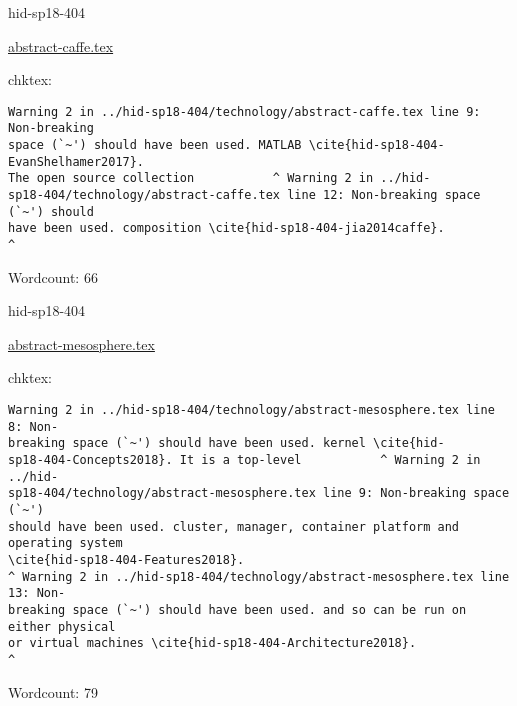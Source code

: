 

\begin{IU}

hid-sp18-404

\href{https://github.com/cloudmesh-community/hid-sp18-404/blob/master//technology/abstract-caffe.tex}{abstract-caffe.tex}

 
chktex:
\begin{tiny}
\begin{verbatim}
Warning 2 in ../hid-sp18-404/technology/abstract-caffe.tex line 9: Non-breaking
space (`~') should have been used. MATLAB \cite{hid-sp18-404-EvanShelhamer2017}.
The open source collection           ^ Warning 2 in ../hid-
sp18-404/technology/abstract-caffe.tex line 12: Non-breaking space (`~') should
have been used. composition \cite{hid-sp18-404-jia2014caffe}.                ^
\end{verbatim}
\end{tiny}

Wordcount: 66

\end{IU}



\begin{IU}

hid-sp18-404

\href{https://github.com/cloudmesh-community/hid-sp18-404/blob/master//technology/abstract-mesosphere.tex}{abstract-mesosphere.tex}

 
chktex:
\begin{tiny}
\begin{verbatim}
Warning 2 in ../hid-sp18-404/technology/abstract-mesosphere.tex line 8: Non-
breaking space (`~') should have been used. kernel \cite{hid-
sp18-404-Concepts2018}. It is a top-level           ^ Warning 2 in ../hid-
sp18-404/technology/abstract-mesosphere.tex line 9: Non-breaking space (`~')
should have been used. cluster, manager, container platform and operating system
\cite{hid-sp18-404-Features2018}.
^ Warning 2 in ../hid-sp18-404/technology/abstract-mesosphere.tex line 13: Non-
breaking space (`~') should have been used. and so can be run on either physical
or virtual machines \cite{hid-sp18-404-Architecture2018}.
^
\end{verbatim}
\end{tiny}

Wordcount: 79

\end{IU}

